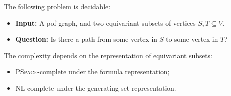 \begin{theorem}\label{thm:reachability-decidable-pof}
    The following problem is decidable: 
    \begin{itemize}
        \item \textbf{Input:} A pof graph, and two equivariant subsets of vertices $S,T \subseteq V$.
        \item \textbf{Question:} Is there a path from some vertex in  $S$ to some vertex in $T$?
    \end{itemize}
    The complexity depends on the representation of equivariant subsets:
    \begin{itemize}
        \item \textsc{PSpace}-complete under the formula representation;
        \item \textsc{NL}-complete under the generating set representation.
    \end{itemize} 
\end{theorem}
